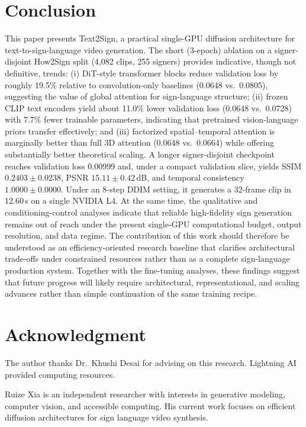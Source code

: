 \documentclass{ieeeaccess}
\begin{document}
\section{Conclusion}
\label{sec:conclusion}

This paper presents Text2Sign, a practical single-GPU diffusion architecture for text-to-sign-language video generation. The short (3-epoch) ablation on a signer-disjoint How2Sign split (4,082 clips, 255 signers) provides indicative, though not definitive, trends: (i) DiT-style transformer blocks reduce validation loss by roughly 19.5\% relative to convolution-only baselines (0.0648 vs.\ 0.0805), suggesting the value of global attention for sign-language structure; (ii) frozen CLIP text encoders yield about 11.0\% lower validation loss (0.0648 vs.\ 0.0728) with 7.7\% fewer trainable parameters, indicating that pretrained vision-language priors transfer effectively; and (iii) factorized spatial--temporal attention is marginally better than full 3D attention (0.0648 vs.\ 0.0664) while offering substantially better theoretical scaling. A longer signer-disjoint checkpoint reaches validation loss 0.00999 and, under a compact validation slice, yields SSIM $0.2403\pm0.0238$, PSNR $15.11\pm0.42$\,dB, and temporal consistency $1.0000\pm0.0000$. Under an 8-step DDIM setting, it generates a 32-frame clip in 12.60\,s on a single NVIDIA L4. At the same time, the qualitative and conditioning-control analyses indicate that reliable high-fidelity sign generation remains out of reach under the present single-GPU computational budget, output resolution, and data regime. The contribution of this work should therefore be understood as an efficiency-oriented research baseline that clarifies architectural trade-offs under constrained resources rather than as a complete sign-language production system. Together with the fine-tuning analyses, these findings suggest that future progress will likely require architectural, representational, and scaling advances rather than simple continuation of the same training recipe.

\section*{Acknowledgment}
The author thanks Dr.\ Khushi Desai for advising on this research. Lightning AI provided computing resources.




\begin{IEEEbiographynophoto}{Ruize Xia}
is an independent researcher with interests in generative modeling, computer vision, and accessible computing. His current work focuses on efficient diffusion architectures for sign language video synthesis.
\end{IEEEbiographynophoto}

\EOD
\end{document}
